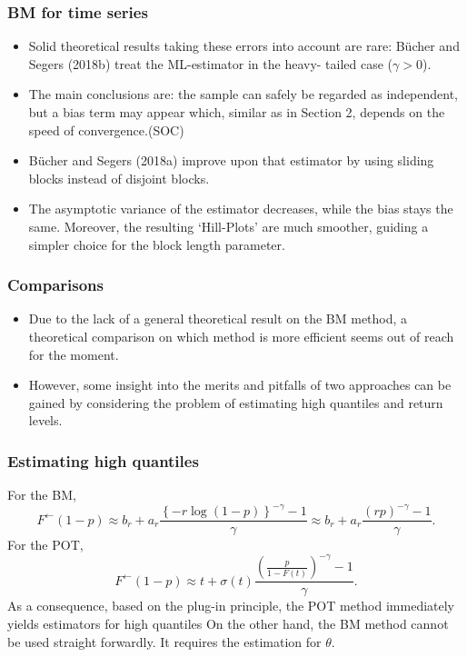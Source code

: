 \documentclass{beamer}
\newcommand{\set}[1]{\left\{#1\right\}}
\begin{document}
\begin{frame}
    \frametitle{BM for time series}

\begin{itemize}
    \item Solid theoretical results taking these
    errors into account are rare: Bücher and Segers (2018b) treat the ML-estimator in the heavy-
    tailed case ($\gamma>0$).
    \item The main conclusions are: the sample can safely be regarded as independent,
    but a bias term may appear which, similar as in Section 2, depends on the speed of convergence.(SOC)
    \item Bücher and Segers (2018a) improve upon that estimator by using sliding blocks instead
    of disjoint blocks. 
    \item The asymptotic variance of the estimator decreases, while the bias stays the
    same. Moreover, the resulting ‘Hill-Plots’ are much smoother, guiding a simpler choice for the
    block length parameter.
\end{itemize}

\end{frame}


\begin{frame}
    \frametitle{Comparisons}

    \begin{itemize}
        \item Due to the lack of a general theoretical result on the BM method, a theoretical comparison on 
        which method is more efficient seems out of reach for the moment.
        \item However, some insight into the merits and pitfalls of two approaches can be
        gained by considering the problem of estimating high quantiles and return levels.
    \end{itemize}

\end{frame}


\begin{frame}
    \frametitle{Estimating high quantiles}
For the BM,
$$
F^{\leftarrow}(1-p)\approx b_r+a_r\frac{\set{-r\log(1-p)}^{-\gamma}-1}{\gamma}\approx b_r+a_r\frac{(rp)^{-\gamma}-1}{\gamma}.
$$
For the POT,
$$
F^{\leftarrow}(1-p)\approx t+\sigma(t)\frac{(\frac{p}{1-F(t)})^{-\gamma}-1}{\gamma}.
$$
As a consequence, based on the plug-in principle, the POT method immediately
yields estimators for high quantiles On the other hand, the BM method cannot be used straight forwardly. It requires the estimation for $\theta$.
\end{frame}
\end{document}

